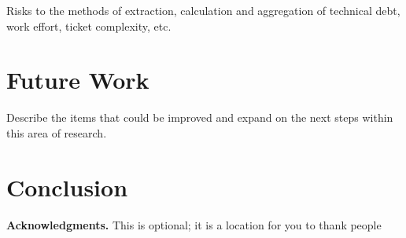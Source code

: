 \documentclass{mpaper}
\begin{document}
Risks to the methods of extraction, calculation and aggregation of technical
debt, work effort, ticket complexity, etc.


\section{Future Work}
\label{future-work}

Describe the items that could be improved and expand on the next steps within
this area of research.

\section{Conclusion}
\label{conclusion}

{\bf Acknowledgments.} This is optional; it is a location for you to thank
people



\end{document}
